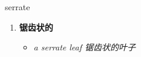 
\begin{frame}
{\huge serrate}
\begin{center}
\begin{enumerate}\Large
  \item \textbf{锯齿状的}
  \begin{itemize}
    \item \em{\Large{a serrate leaf 锯齿状的叶子}}
  \end{itemize}
\end{enumerate}
\end{center}
\end{frame}
